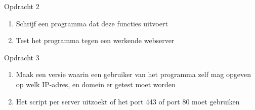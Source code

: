 Opdracht 2
\begin{enumerate}
	\item Schrijf een programma dat deze functies uitvoert
	\item Test het programma tegen een werkende webserver
\end{enumerate}

Opdracht 3
\begin{enumerate}
	\item Maak een versie waarin een gebruiker van het programma zelf mag opgeven op welk IP-adres, en domein er getest moet worden
	\item Het script per server uitzoekt of het port 443 of port 80 moet gebruiken
\end{enumerate}


